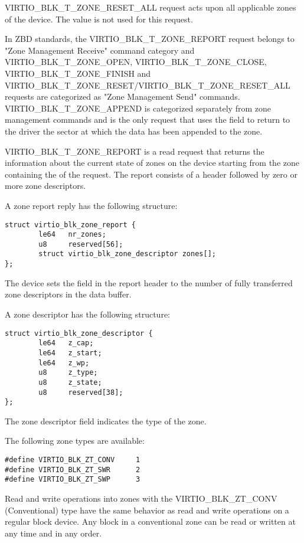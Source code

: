 VIRTIO_BLK_T_ZONE_RESET_ALL request acts upon all applicable zones of the
device. The  value is not used for this request.

In ZBD standards, the VIRTIO_BLK_T_ZONE_REPORT request belongs to "Zone
Management Receive" command category and VIRTIO_BLK_T_ZONE_OPEN,
VIRTIO_BLK_T_ZONE_CLOSE, VIRTIO_BLK_T_ZONE_FINISH and
VIRTIO_BLK_T_ZONE_RESET/VIRTIO_BLK_T_ZONE_RESET_ALL requests are categorized as
"Zone Management Send" commands. VIRTIO_BLK_T_ZONE_APPEND is categorized
separately from zone management commands and is the only request that uses
the  field  to return
to the driver the sector at which the data has been appended to the zone.

VIRTIO_BLK_T_ZONE_REPORT is a read request that returns the information about
the current state of zones on the device starting from the zone containing the
 of the request. The report consists of a header followed by zero
or more zone descriptors.

A zone report reply has the following structure:

\begin{lstlisting}
struct virtio_blk_zone_report {
        le64   nr_zones;
        u8     reserved[56];
        struct virtio_blk_zone_descriptor zones[];
};
\end{lstlisting}

The device sets the  field in the report header to the number of
fully transferred zone descriptors in the data buffer.

A zone descriptor has the following structure:

\begin{lstlisting}
struct virtio_blk_zone_descriptor {
        le64   z_cap;
        le64   z_start;
        le64   z_wp;
        u8     z_type;
        u8     z_state;
        u8     reserved[38];
};
\end{lstlisting}

The zone descriptor field  
indicates the type of the zone.

The following zone types are available:

\begin{lstlisting}
#define VIRTIO_BLK_ZT_CONV     1
#define VIRTIO_BLK_ZT_SWR      2
#define VIRTIO_BLK_ZT_SWP      3
\end{lstlisting}

Read and write operations into zones with the VIRTIO_BLK_ZT_CONV (Conventional)
type have the same behavior as read and write operations on a regular block
device. Any block in a conventional zone can be read or written at any time and
in any order.


